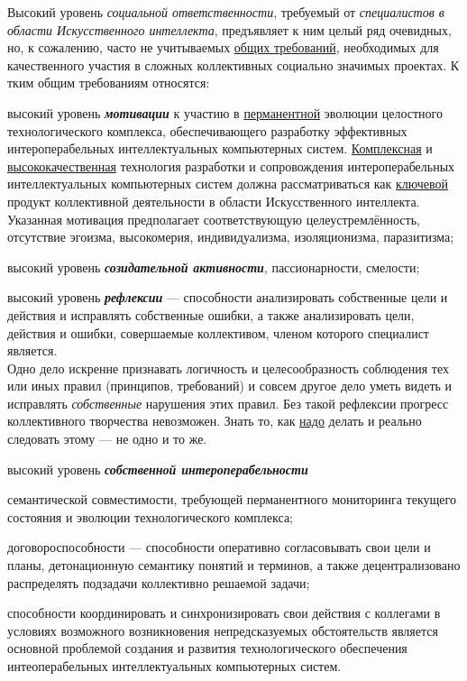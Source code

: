 Высокий уровень \textit{социальной ответственности}, требуемый от \textit{специалистов в области Искусственного интеллекта}, предъявляет к ним целый ряд очевидных, но, к сожалению, часто не учитываемых \uline{общих требований}, необходимых для качественного участия в сложных коллективных социально значимых проектах. К тким общим требованиям относятся:

\begin{textitemize}
	\item  высокий уровень \textbf{\textit{мотивации}} к участию в \uline{перманентной} эволюции целостного технологического комплекса, обеспечивающего разработку эффективных интероперабельных интеллектуальных компьютерных систем. \uline{Комплексная} и \uline{высококачественная} технология разработки и сопровождения интероперабельных интеллектуальных компьютерных систем должна рассматриваться как \uline{ключевой} продукт коллективной деятельности в области Искусственного интеллекта.\\
	Указанная мотивация предполагает соответствующую целеустремлённость, отсутствие эгоизма, высокомерия, индивидуализма, изоляционизма, паразитизма;
	\item высокий уровень \textbf{\textit{созидательной активности}}, пассионарности, смелости;
	\item высокий уровень \textbf{\textit{рефлексии}} --- способности анализировать собственные цели и действия и исправлять собственные ошибки, а также анализировать цели, действия и ошибки, совершаемые коллективом, членом которого специалист является.\\
	Одно дело искренне признавать логичность и целесообразность соблюдения тех или иных правил (принципов, требований) и совсем другое дело уметь видеть и исправлять \textit{собственные} нарушения этих правил. Без такой рефлексии прогресс коллективного творчества невозможен. Знать то, как \uline{надо} делать и реально следовать этому --- не одно и то же.
	\item высокий уровень \textbf{\textit{собственной интероперабельности}}
	\begin{textitemize}
		\item семантической совместимости, требующей перманентного мониторинга текущего состояния и эволюции технологического комплекса;
		\item договороспособности --- способности оперативно согласовывать свои цели и планы, детонационную семантику понятий и терминов, а также децентрализовано распределять подзадачи коллективно решаемой задачи;
		\item способности координировать и синхронизировать свои действия с коллегами в условиях возможного возникновения непредсказуемых обстоятельств является основной проблемой создания и развития технологического обеспечения интеоперабельных интеллектуальных компьютерных систем.

\end{textitemize}
\end{textitemize}
